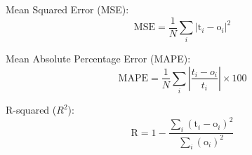 \documentclass{article}
\begin{document}
Mean Squared Error (MSE):
\begin{equation}
\mathrm{MSE} = \frac{1}{N} \sum_{i}\left|\mathrm{t}_{i}-\mathrm{o}_{i}\right|^{2}
\end{equation}

Mean Absolute Percentage Error (MAPE):
\begin{equation}
\mathrm{MAPE} = \frac{1}{N} \sum_{i}\left|\frac{t_{i}-o_{i}}{t_{i}}\right| \times 100
\end{equation}

R-squared (\( R^2 \)):
\begin{equation}
\mathrm{R} = 1 - \frac{\sum_{i}(\mathrm{t}_{i}-\mathrm{o}_{i})^{2}}{\sum_{i}(\mathrm{o}_{i})^{2}}
\end{equation}
\end{document}
